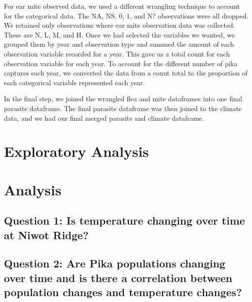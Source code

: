 \documentclass[
  12pt,
]{article}
\begin{document}
For ear mite observed data, we used a different wrangling technique to
account for the categorical data. The NA, NS, 0, 1, and N? observations
were all dropped. We retained only observations where ear mite
observation data was collected. These are N, L, M, and H. Once we had
selected the variables we wanted, we grouped them by year and
observation type and summed the amount of each observation variable
recorded for a year. This gave us a total count for each observation
variable for each year. To account for the different number of pika
captures each year, we converted the data from a count total to the
proportion of each categorical variable represented each year.

In the final step, we joined the wrangled flea and mite dataframes into
one final parasite dataframe. The final parasite dataframe was then
joined to the climate data, and we had our final merged parasite and
climate dataframe.

\newpage

\hypertarget{exploratory-analysis}{%
\section{Exploratory Analysis}\label{exploratory-analysis}}

\newpage

\hypertarget{analysis}{%
\section{Analysis}\label{analysis}}

\hypertarget{question-1-is-temperature-changing-over-time-at-niwot-ridge}{%
\subsection{Question 1: Is temperature changing over time at Niwot
Ridge?}\label{question-1-is-temperature-changing-over-time-at-niwot-ridge}}

\hypertarget{question-2-are-pika-populations-changing-over-time-and-is-there-a-correlation-between-population-changes-and-temperature-changes}{%
\subsection{Question 2: Are Pika populations changing over time and is
there a correlation between population changes and temperature
changes?}\label{question-2-are-pika-populations-changing-over-time-and-is-there-a-correlation-between-population-changes-and-temperature-changes}}
\end{document}
